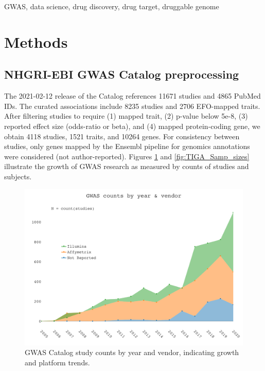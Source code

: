 GWAS, data science, drug discovery, drug target, druggable genome

\section{Methods}

\subsection{NHGRI-EBI GWAS Catalog preprocessing}

The 2021-02-12 release of the Catalog references 11671 studies and 4865 PubMed IDs. The curated associations include 8235 studies and 2706 EFO-mapped traits. After filtering studies to require (1) mapped trait, (2) p-value below 5e-8, (3) reported effect size (odds-ratio or beta), and (4) mapped protein-coding gene, we obtain 4118 studies, 1521 traits, and 10264 genes. For consistency between studies, only genes mapped by the Ensembl pipeline for genomics annotations were considered (not author-reported). Figures \ref{fig:TIGA_Study_coun} and \ref{fig:TIGA_Samp_sizes} illustrate the growth of GWAS research as measured by counts of studies and subjects.  

\begin{figure}
	\includegraphics[width=\textwidth]{figures/tiga/FIG01_Study_counts.png}
	\caption{GWAS Catalog study counts by year and vendor, indicating growth and platform trends.}
	\label{fig:TIGA_Study_coun}
\end{figure}

